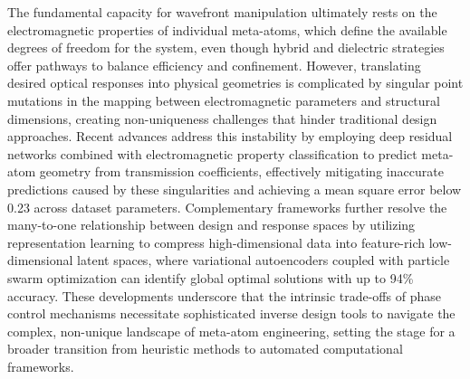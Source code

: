 \documentclass[11pt]{article}
\begin{document}
The fundamental capacity for wavefront manipulation ultimately rests on the electromagnetic properties of individual meta-atoms, which define the available degrees of freedom for the system, even though hybrid and dielectric strategies offer pathways to balance efficiency and confinement. However, translating desired optical responses into physical geometries is complicated by singular point mutations in the mapping between electromagnetic parameters and structural dimensions, creating non-uniqueness challenges that hinder traditional design approaches. Recent advances address this instability by employing deep residual networks combined with electromagnetic property classification to predict meta-atom geometry from transmission coefficients, effectively mitigating inaccurate predictions caused by these singularities and achieving a mean square error below 0.23 across dataset parameters. \citep{doi_10_1109_iccem60619_2024_10559188_c3199408} \citep{doi_10_1109_isctis58954_2023_10213114_7fee3b45} Complementary frameworks further resolve the many-to-one relationship between design and response spaces by utilizing representation learning to compress high-dimensional data into feature-rich low-dimensional latent spaces, where variational autoencoders coupled with particle swarm optimization can identify global optimal solutions with up to 94\% accuracy. These developments underscore that the intrinsic trade-offs of phase control mechanisms necessitate sophisticated inverse design tools to navigate the complex, non-unique landscape of meta-atom engineering, setting the stage for a broader transition from heuristic methods to automated computational frameworks. \citep{doi_10_1109_iccem60619_2024_10559188_c3199408} \citep{doi_10_2139_ssrn_4082312_28ca582d}
\end{document}
